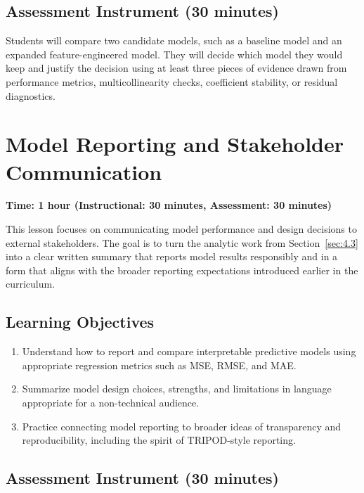 \subsection{Assessment Instrument (30 minutes)}

Students will compare two candidate models, such as a baseline model and an expanded feature-engineered model. They will decide which model they would keep and justify the decision using at least three pieces of evidence drawn from performance metrics, multicollinearity checks, coefficient stability, or residual diagnostics.

\section{Model Reporting and Stakeholder Communication}
\label{sec:4.4}

\textbf{Time: 1 hour (Instructional: 30 minutes, Assessment: 30 minutes)}

\noindent This lesson focuses on communicating model performance and design decisions to external stakeholders. The goal is to turn the analytic work from Section~\ref{sec:4.3} into a clear written summary that reports model results responsibly and in a form that aligns with the broader reporting expectations introduced earlier in the curriculum.

\subsection{Learning Objectives}

\begin{enumerate}
    \item Understand how to report and compare interpretable predictive models using appropriate regression metrics such as MSE, RMSE, and MAE.
    \item Summarize model design choices, strengths, and limitations in language appropriate for a non-technical audience.
    \item Practice connecting model reporting to broader ideas of transparency and reproducibility, including the spirit of TRIPOD-style reporting.
\end{enumerate}

\subsection{Assessment Instrument (30 minutes)}

